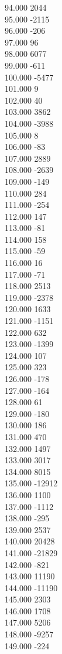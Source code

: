 { 94.000	2044 \\
 95.000	-2115 \\
 96.000	-206 \\
 97.000	96 \\
 98.000	6077 \\
 99.000	-611 \\
 100.000	-5477 \\
 101.000	9 \\
 102.000	40 \\
 103.000	3862 \\
 104.000	-3988 \\
 105.000	8 \\
 106.000	-83 \\
 107.000	2889 \\
 108.000	-2639 \\
 109.000	-149 \\
 110.000	284 \\
 111.000	-254 \\
 112.000	147 \\
 113.000	-81 \\
 114.000	158 \\
 115.000	-59 \\
 116.000	16 \\
 117.000	-71 \\
 118.000	2513 \\
 119.000	-2378 \\
 120.000	1633 \\
 121.000	-1151 \\
 122.000	632 \\
 123.000	-1399 \\
 124.000	107 \\
 125.000	323 \\
 126.000	-178 \\
 127.000	-164 \\
 128.000	61 \\
 129.000	-180 \\
 130.000	186 \\
 131.000	470 \\
 132.000	1497 \\
 133.000	3017 \\
 134.000	8015 \\
 135.000	-12912 \\
 136.000	1100 \\
 137.000	-1112 \\
 138.000	-295 \\
 139.000	2537 \\
 140.000	20428 \\
 141.000	-21829 \\
 142.000	-821 \\
 143.000	11190 \\
 144.000	-11190 \\
 145.000	2303 \\
 146.000	1708 \\
 147.000	5206 \\
 148.000	-9257 \\
 149.000	-224 \\
}

